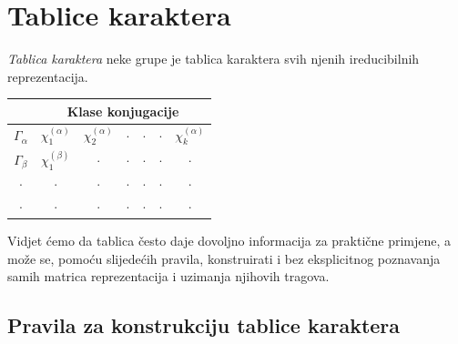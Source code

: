 \section{Tablice karaktera}
\label{sec:karakteri}

\emph{Tablica karaktera} neke grupe je tablica karaktera svih njenih
ireducibilnih reprezentacija.
\begin{center}
    \setlength{\tabcolsep}{12pt}
    \renewcommand{\arraystretch}{2.0}
\begin{tabular}{c|cccccc}
               & \multicolumn{6}{c}{Klase konjugacije} \\ \hline
  $\Gamma_{\alpha}$ & $\chi_{1}^{(\alpha)}$ & $\chi_{2}^{(\alpha)}$ & $\cdot$ &
       $\cdot$ & $\cdot$ & $\chi_{k}^{(\alpha)}$ \\
  $\Gamma_{\beta}$  & $\chi_{1}^{(\beta)}$  & $\cdot$ & $\cdot$ & $\cdot$ & $\cdot$  & $\cdot$ \\
     $\cdot$ &  $\cdot$   & $\cdot$ & $\cdot$ & $\cdot$ & $\cdot$  & $\cdot$ \\
     $\cdot$ &  $\cdot$   & $\cdot$ & $\cdot$ & $\cdot$ & $\cdot$  & $\cdot$ \\
\end{tabular}
    \renewcommand{\arraystretch}{1.0}
\end{center}
Vidjet ćemo da tablica često daje dovoljno informacija za praktične primjene, a može
se, pomoću slijedećih pravila, konstruirati i bez eksplicitnog
poznavanja samih matrica reprezentacija i uzimanja njihovih tragova.

\subsection*{Pravila za konstrukciju tablice karaktera}

